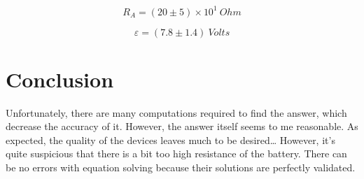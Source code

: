 \documentclass[12pt]{memoir}
\begin{document}
    \begin{equation*}
        R_A = (20 \pm 5) \times 10^1 ~Ohm
    \end{equation*}

    \begin{equation*}
        \varepsilon = (7.8 \pm 1.4) ~Volts
    \end{equation*}


    \section{Conclusion}\label{sec:conclusion}
    Unfortunately, there are many computations required to find the answer, which decrease the accuracy of it.\newline
    However, the answer itself seems to me reasonable.\newline
    As expected, the quality of the devices leaves much to be desired\ldots\newline
    However, it's quite suspicious that there is a bit too high resistance of the battery.\newline
    There can be no errors with equation solving because their solutions are perfectly validated.
\end{document}
